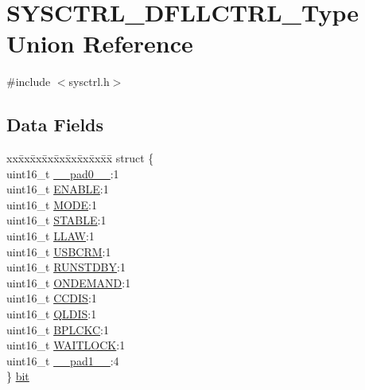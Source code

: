 \hypertarget{union_s_y_s_c_t_r_l___d_f_l_l_c_t_r_l___type}{}\section{S\+Y\+S\+C\+T\+R\+L\+\_\+\+D\+F\+L\+L\+C\+T\+R\+L\+\_\+\+Type Union Reference}
\label{union_s_y_s_c_t_r_l___d_f_l_l_c_t_r_l___type}


{\ttfamily \#include $<$sysctrl.\+h$>$}

\subsection*{Data Fields}
\begin{DoxyCompactItemize}
\item 
\begin{tabbing}
xx\=xx\=xx\=xx\=xx\=xx\=xx\=xx\=xx\=\kill
struct \{\\
\>uint16\_t \mbox{\hyperlink{union_s_y_s_c_t_r_l___d_f_l_l_c_t_r_l___type_a77132c2c26a75f5b8751b235cda23828}{\_\_pad0\_\_}}:1\\
\>uint16\_t \mbox{\hyperlink{union_s_y_s_c_t_r_l___d_f_l_l_c_t_r_l___type_aec203800ebef356dc04f3e8986a824d8}{ENABLE}}:1\\
\>uint16\_t \mbox{\hyperlink{union_s_y_s_c_t_r_l___d_f_l_l_c_t_r_l___type_abd348ee828aadd0781f3fa97d167e564}{MODE}}:1\\
\>uint16\_t \mbox{\hyperlink{union_s_y_s_c_t_r_l___d_f_l_l_c_t_r_l___type_a086f39f4886c0847902d3df85ef6efee}{STABLE}}:1\\
\>uint16\_t \mbox{\hyperlink{union_s_y_s_c_t_r_l___d_f_l_l_c_t_r_l___type_a045c9148b8e3c7e3ff078eda90761d64}{LLAW}}:1\\
\>uint16\_t \mbox{\hyperlink{union_s_y_s_c_t_r_l___d_f_l_l_c_t_r_l___type_ab1dabdf102e02c06e374206bfb8b3655}{USBCRM}}:1\\
\>uint16\_t \mbox{\hyperlink{union_s_y_s_c_t_r_l___d_f_l_l_c_t_r_l___type_a0a98954fc108f309f3232355e809617b}{RUNSTDBY}}:1\\
\>uint16\_t \mbox{\hyperlink{union_s_y_s_c_t_r_l___d_f_l_l_c_t_r_l___type_a93f43f8127aa6a27551de4ddad9cd47e}{ONDEMAND}}:1\\
\>uint16\_t \mbox{\hyperlink{union_s_y_s_c_t_r_l___d_f_l_l_c_t_r_l___type_adcce1ee21dd1312877af3834eb89465c}{CCDIS}}:1\\
\>uint16\_t \mbox{\hyperlink{union_s_y_s_c_t_r_l___d_f_l_l_c_t_r_l___type_a2bef3a94216d6c062705d8b4dad28bf0}{QLDIS}}:1\\
\>uint16\_t \mbox{\hyperlink{union_s_y_s_c_t_r_l___d_f_l_l_c_t_r_l___type_a5cca3658a1f1bdcec3de2c5bb3595286}{BPLCKC}}:1\\
\>uint16\_t \mbox{\hyperlink{union_s_y_s_c_t_r_l___d_f_l_l_c_t_r_l___type_a6deb12a80d51d2024a2a4b387b99a318}{WAITLOCK}}:1\\
\>uint16\_t \mbox{\hyperlink{union_s_y_s_c_t_r_l___d_f_l_l_c_t_r_l___type_ab72e3a1f2f7db8695c60c658f5a0f11a}{\_\_pad1\_\_}}:4\\
\} \mbox{\hyperlink{union_s_y_s_c_t_r_l___d_f_l_l_c_t_r_l___type_aadab19578de6709d2394b8b323f55d79}{bit}}\\


\end{tabbing}
\end{DoxyCompactItemize}
